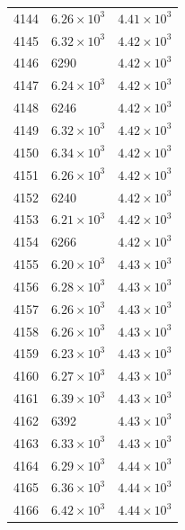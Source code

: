 \begin{table}[H]
\begin{tabular}{lll}
4144 & $\displaystyle 6.26 \times 10^{3}$ & $\displaystyle 4.41 \times 10^{3}$ \\
4145 & $\displaystyle 6.32 \times 10^{3}$ & $\displaystyle 4.42 \times 10^{3}$ \\
4146 & 6290 & $\displaystyle 4.42 \times 10^{3}$ \\
4147 & $\displaystyle 6.24 \times 10^{3}$ & $\displaystyle 4.42 \times 10^{3}$ \\
4148 & 6246 & $\displaystyle 4.42 \times 10^{3}$ \\
4149 & $\displaystyle 6.32 \times 10^{3}$ & $\displaystyle 4.42 \times 10^{3}$ \\
4150 & $\displaystyle 6.34 \times 10^{3}$ & $\displaystyle 4.42 \times 10^{3}$ \\
4151 & $\displaystyle 6.26 \times 10^{3}$ & $\displaystyle 4.42 \times 10^{3}$ \\
4152 & 6240 & $\displaystyle 4.42 \times 10^{3}$ \\
4153 & $\displaystyle 6.21 \times 10^{3}$ & $\displaystyle 4.42 \times 10^{3}$ \\
4154 & 6266 & $\displaystyle 4.42 \times 10^{3}$ \\
4155 & $\displaystyle 6.20 \times 10^{3}$ & $\displaystyle 4.43 \times 10^{3}$ \\
4156 & $\displaystyle 6.28 \times 10^{3}$ & $\displaystyle 4.43 \times 10^{3}$ \\
4157 & $\displaystyle 6.26 \times 10^{3}$ & $\displaystyle 4.43 \times 10^{3}$ \\
4158 & $\displaystyle 6.26 \times 10^{3}$ & $\displaystyle 4.43 \times 10^{3}$ \\
4159 & $\displaystyle 6.23 \times 10^{3}$ & $\displaystyle 4.43 \times 10^{3}$ \\
4160 & $\displaystyle 6.27 \times 10^{3}$ & $\displaystyle 4.43 \times 10^{3}$ \\
4161 & $\displaystyle 6.39 \times 10^{3}$ & $\displaystyle 4.43 \times 10^{3}$ \\
4162 & 6392 & $\displaystyle 4.43 \times 10^{3}$ \\
4163 & $\displaystyle 6.33 \times 10^{3}$ & $\displaystyle 4.43 \times 10^{3}$ \\
4164 & $\displaystyle 6.29 \times 10^{3}$ & $\displaystyle 4.44 \times 10^{3}$ \\
4165 & $\displaystyle 6.36 \times 10^{3}$ & $\displaystyle 4.44 \times 10^{3}$ \\
4166 & $\displaystyle 6.42 \times 10^{3}$ & $\displaystyle 4.44 \times 10^{3}$ \\

\end{tabular}
\end{table}
